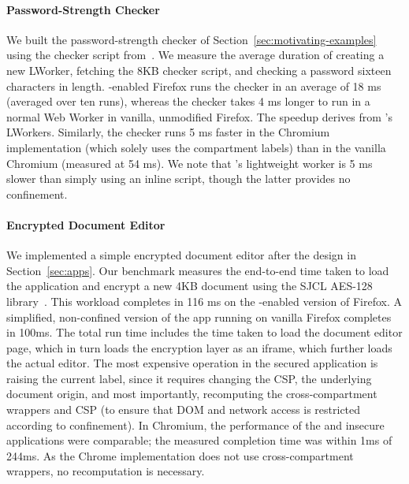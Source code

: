 \paragraph{Password-Strength Checker}
%
We built the password-strength checker of
Section~\ref{sec:motivating-examples} using the checker script
from~\cite{checker1}.
%
We measure the average duration of creating a new LWorker, fetching
the 8KB checker script, and checking a password sixteen characters in
length.
%
\sys{}-enabled Firefox runs the checker in an average of 18 ms (averaged
over ten runs), whereas the checker takes 4 ms longer to run in a
normal Web Worker in vanilla, unmodified Firefox. The speedup derives
from \sys{}'s LWorkers.
%
%
Similarly, the checker runs 5 ms faster in the \sys{} Chromium
implementation (which solely uses the compartment labels) than in the
vanilla Chromium (measured at 54 ms).
%
We note that \sys{}'s lightweight worker is 5 ms slower than simply
using an inline script, though the latter provides no confinement.

\paragraph{Encrypted Document Editor}

We implemented a simple encrypted document editor after the
design in Section~\ref{sec:apps}.
%
Our benchmark measures the end-to-end time taken to load the
application and encrypt a new 4KB document using
the SJCL AES-128 library~\cite{sjcl}.
%
This workload completes in 116 ms on the \sys{}-enabled
version of Firefox. A simplified, non-confined version of the app
running on vanilla Firefox completes in 100ms.
%
The total run time includes the time taken to load the document editor
page, which in turn loads the encryption layer as an iframe, which
further loads the actual editor.
%
The most expensive operation in the secured application is raising the
current label, since it requires changing the CSP, the underlying
document origin, and most importantly, recomputing the
cross-compartment wrappers and CSP (to ensure that DOM and network
access is restricted according to confinement).
%
In Chromium, the performance of the \sys{} and insecure applications
were comparable; the measured completion time was within 1ms of 244ms.
%
As the Chrome implementation does not use cross-compartment
wrappers, no recomputation is necessary.


